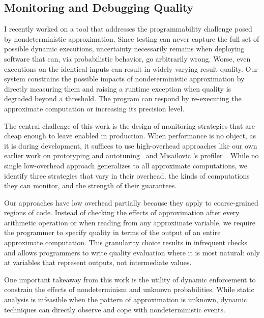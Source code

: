 
\subsection{Monitoring and Debugging Quality}

I recently worked on a tool that addresses the programmability challenge posed
by nondeterministic approximation. Since testing can never capture
the full set of possible dynamic executions, uncertainty necessarily remains
when deploying software that can, via probabilistic behavior, go arbitrarily
wrong. Worse, even executions on the identical inputs can result in
widely varying result quality. Our system constrains the possible impacts of
nondeterministic approximation by directly measuring them and raising a
runtime exception when quality is degraded beyond a threshold. The program can
respond by re-executing the approximate computation or increasing its
precision level.

The central challenge of this work is the design of monitoring strategies that
are cheap enough to leave enabled in production. When performance is no object,
as it is during development, it suffices to use high-overhead approaches like our
own earlier work on prototyping and autotuning~\cite{enercaml} and Misailovic
\etal's profiler~\cite{qosprof}.
While no single low-overhead approach
generalizes to all approximate computations, we identify three strategies that
vary in their overhead, the kinds of computations they can monitor, and the
strength of their guarantees.

Our approaches have low overhead partially because they apply to
coarse-grained regions of code. Instead of checking the effects of
approximation after every arithmetic operation or when reading from any
approximate variable, we require the programmer to specify quality in terms of
the output of an entire approximate computation. This granularity choice
results in infrequent checks and allows programmers to write quality
evaluation where it is most natural: only at variables that represent outputs, not intermediate
values.

One important takeaway from this work is the utility of dynamic enforcement
to constrain the effects of nondeterminism and unknown probabilities. While
static analysis is infeasible when the pattern of approximation is unknown,
dynamic techniques can directly observe and cope with nondeterministic events.




